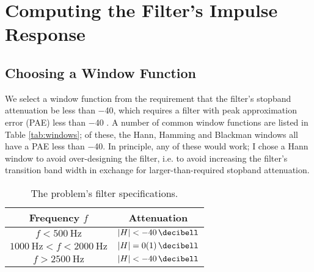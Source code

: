 





\newpage
\tableofcontents
\newpage

\section{Computing the Filter's Impulse Response}

\subsection{Choosing a Window Function}

We select a window function from the requirement that the filter's stopband attenuation be less than \SI{-40}{\decibell}, which requires a filter with peak approximation error (PAE) less than \SI{-40}{\decibell} \cite{introdsp, proakis}.
A number of common window functions are listed in Table \ref{tab:windows}; of these, the Hann, Hamming and Blackman windows all have a PAE less than \SI{-40}{\decibell}.
In principle, any of these would work; I chose a Hann window to avoid over-designing the filter, i.e. to avoid increasing the filter's transition band width in exchange for larger-than-required stopband attenuation.

\begin{table}[htb!]
    \centering
    \begin{tabular}{|c|c|}
        \hline
        Frequency $ f $ & Attenuation \\
        \hline
        \hline
        $ f < \SI{500}{\hertz} $ & $ \abs{H} < \SI{-40}{\decibell} $ \\
        $ \SI{1000}{\hertz} < f < \SI{2000}{\hertz} $ & $ \abs{H} = \SI{0 \pm 1}{\decibell} $ \\
        $ f > \SI{2500}{\hertz} $ & $ \abs{H} < \SI{-40}{\decibell} $ \\
        \hline
    \end{tabular}
    \caption{The problem's filter specifications.}
    \label{tab:specs}
\end{table}

